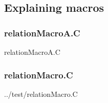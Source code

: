 \newpage
\subsection*{Explaining macros}
\subsubsection*{relationMacroA.C}

{relationMacroA.C}
\subsubsection*{relationMacro.C}

{../test/relationMacro.C}

